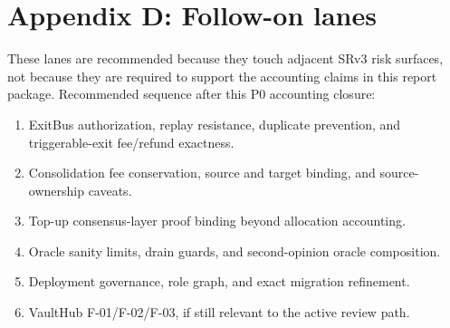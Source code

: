 \section{Appendix D: Follow-on lanes}
\label{app:follow-on}

\noindent These lanes are recommended because they touch adjacent SRv3 risk
surfaces, not because they are required to support the accounting claims in this
report package. Recommended sequence after this P0 accounting closure:

\begin{enumerate}
  \item ExitBus authorization, replay resistance, duplicate prevention, and
  triggerable-exit fee/refund exactness.
  \item Consolidation fee conservation, source and target binding, and
  source-ownership caveats.
  \item Top-up consensus-layer proof binding beyond allocation accounting.
  \item Oracle sanity limits, drain guards, and second-opinion oracle composition.
  \item Deployment governance, role graph, and exact migration refinement.
  \item VaultHub F-01/F-02/F-03, if still relevant to the active review path.
\end{enumerate}
